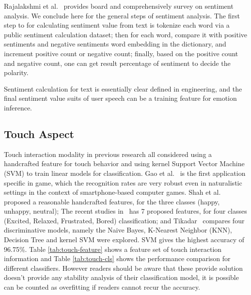 Rajalakshmi et al.~\cite{Rajalakshmi2017ACS} provides board and comprehensively survey on sentiment analysis. We conclude here for the general steps of sentiment analysis. The first step to for calculating sentiment value from text is tokenize each word via a public sentiment calculation dataset; then for each word, compare it with positive sentiments and negative sentiments word embedding in the dictionary, and increment positive count or negative count; finally, based on the positive count and negative count, one can get result percentage of sentiment to decide the polarity.

Sentiment calculation for text is essentially clear defined in engineering, and the final sentiment value suits of user speech can be a training feature for emotion inference.

\subsection{Touch Aspect}\label{subsec:touch-model}

Touch interaction modality in previous research all considered using a handcrafted feature for touch behavior and using kernel Support Vector Machine (SVM) to train linear models for classification. Gao et al.~\cite{Gao2012} is the first application specific in game, which the recognition rates are very robust even in naturalistic settings in the context of smartphone-based computer games. 
Shah et al.~\cite{Shah2015} proposed a reasonable handcrafted features, for the three classes (happy, unhappy, neutral); The recent studies in~\cite{bhattacharya2017predictive} has 7 proposed features, for four classes (Excited, Relaxed, Frustrated, Bored) classification; and Tikadar~\cite{Tikadar2017} compares four discriminative models, namely the Naive Bayes, K-Nearest Neighbor (KNN), Decision Tree and kernel SVM were explored. SVM gives the highest accuracy of 96.75\%. Table \ref{tab:touch-feature} shows a feature set of touch interaction information and Table \ref{tab:touch-cls} shows the performance comparison for different classifiers. However readers should be aware that these provide solution doesn't provide any stability analysis of their classification model, it is possible can be counted as overfitting if readers cannot recur the accuracy.

